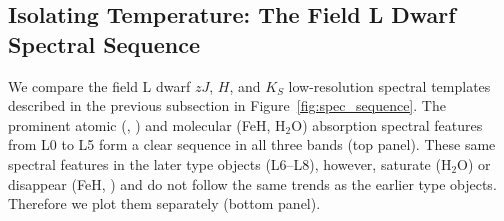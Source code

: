 \documentclass[12pt,preprint]{aastex}
\begin{document}
\subsection{Isolating Temperature: The Field L Dwarf Spectral Sequence}
\label{sec:temp}
We compare the field L dwarf $zJ$, $H$, and $K_S$ low-resolution spectral templates described in the previous subsection in Figure~\ref{fig:spec_sequence}. 
The prominent atomic (, ) and molecular (FeH, H$_2$O) absorption spectral features from L0 to L5 form a clear sequence in all three bands (top panel).
These same spectral features in the later type objects (L6--L8), however, saturate (H$_2$O) or disappear (FeH, ) and do not follow the same trends as the earlier type objects. Therefore we plot them separately (bottom panel).

\end{document}
